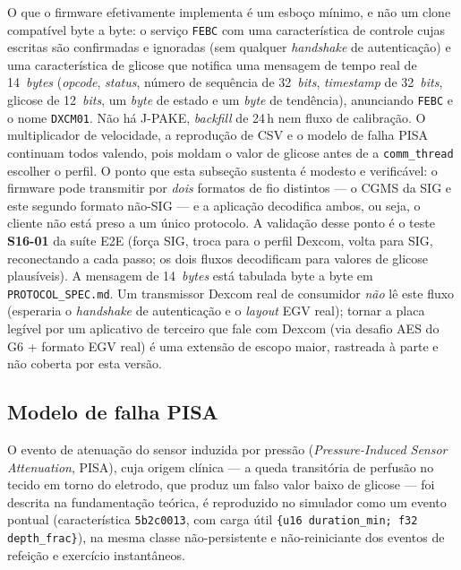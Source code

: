 O que o firmware efetivamente implementa é um esboço mínimo, e não um clone
compatível byte a byte: o serviço \texttt{FEBC} com uma característica de
controle cujas escritas são confirmadas e ignoradas (sem qualquer
\textit{handshake} de autenticação) e uma característica de glicose que
notifica uma mensagem de tempo real de 14~\textit{bytes}
(\textit{opcode}, \textit{status}, número de sequência de 32~\textit{bits},
\textit{timestamp} de 32~\textit{bits}, glicose de 12~\textit{bits}, um
\textit{byte} de estado e um \textit{byte} de tendência), anunciando
\texttt{FEBC} e o nome \texttt{DXCM01}. Não há J-PAKE, \textit{backfill} de
24\,h nem fluxo de calibração. O multiplicador de velocidade, a reprodução de
CSV e o modelo de falha PISA continuam todos valendo, pois moldam o valor de
glicose antes de a \texttt{comm\_thread} escolher o perfil. O ponto que esta
subseção sustenta é modesto e verificável: o firmware pode transmitir por
\emph{dois} formatos de fio distintos --- o CGMS da SIG e este segundo formato
não-SIG --- e a aplicação decodifica ambos, ou seja, o cliente não está preso
a um único protocolo. A validação desse ponto é o teste \textbf{S16-01} da
suíte E2E (força SIG, troca para o perfil Dexcom, volta para SIG, reconectando
a cada passo; os dois fluxos decodificam para valores de glicose plausíveis).
A mensagem de 14~\textit{bytes} está tabulada byte a byte em
\texttt{PROTOCOL\_SPEC.md}. Um transmissor Dexcom real de consumidor
\emph{não} lê este fluxo (esperaria o \textit{handshake} de autenticação e o
\textit{layout} EGV real); tornar a placa legível por um aplicativo de terceiro
que fale com Dexcom (via desafio AES do G6 + formato EGV real) é uma extensão
de escopo maior, rastreada à parte e não coberta por esta versão.

\subsection{Modelo de falha PISA}
\label{sec:impl-pisa}

O evento de atenuação do sensor induzida por pressão (\textit{Pressure-Induced
Sensor Attenuation}, PISA), cuja origem clínica --- a queda transitória de
perfusão no tecido em torno do eletrodo, que produz um falso valor baixo de
glicose --- foi descrita na fundamentação teórica, é reproduzido no simulador
como um evento pontual (característica \texttt{5b2c0013}, com carga útil
\texttt{\{u16 duration\_min; f32 depth\_frac\}}), na mesma classe
não-persistente e não-reiniciante dos eventos de refeição e exercício
instantâneos.

